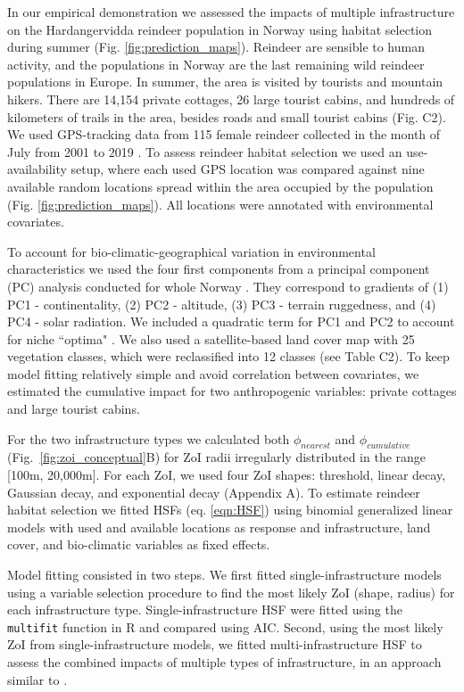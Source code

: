 \documentclass[titlepage]{article}
\begin{document}
In our empirical demonstration we assessed the impacts of multiple infrastructure on the Hardangervidda reindeer population in Norway using habitat selection during summer (Fig. \ref{fig:prediction_maps}). Reindeer are sensible to human activity, and the populations in Norway are the last remaining wild reindeer populations in Europe. In summer, the area is visited by tourists and mountain hikers. There are 14,154 private cottages, 26 large tourist cabins, and hundreds of kilometers of trails in the area, besides roads and small tourist cabins (Fig. C2). We used GPS-tracking data from 115 female reindeer collected in the month of July from 2001 to 2019 \citep[see][for further details]{panzacchi_searching_2015}. To assess reindeer habitat selection we used an use-availability setup, where each used GPS location was compared against nine available random locations spread within the area occupied by the population (Fig. \ref{fig:prediction_maps}). All locations were annotated with environmental covariates.

To account for bio-climatic-geographical variation in environmental characteristics we used the four first components from a principal component (PC) analysis conducted for whole Norway \citep{bakkestuen_step-less_2008}. They correspond to gradients of (1) PC1 - continentality, (2) PC2 - altitude, (3) PC3 - terrain ruggedness, and (4) PC4 - solar radiation. We included a quadratic term for PC1 and PC2 to account for niche ``optima" \citep[\textit{sensu}][]{panzacchi_searching_2015}. We also used a satellite-based land cover map with 25 vegetation classes, which were reclassified into 12 classes (see Table C2). To keep model fitting relatively simple and avoid correlation between covariates, we estimated the cumulative impact for two anthropogenic variables: private cottages and large tourist cabins.

For the two infrastructure types we calculated both $\phi_{nearest}$ and $\phi_{cumulative}$ (Fig.~\ref{fig:zoi_conceptual}B) for ZoI radii irregularly distributed in the range [100m, 20,000m]. For each ZoI, we used four ZoI shapes: threshold, linear decay, Gaussian decay, and exponential decay (Appendix A). To estimate reindeer habitat selection we fitted HSFs (eq. \ref{eqn:HSF}) using binomial generalized linear models \citep{fieberg_how_2021} with used and available locations as response and infrastructure, land cover, and bio-climatic variables as fixed effects. 

Model fitting consisted in two steps. We first fitted single-infrastructure models using a variable selection procedure \citep{burnham_model_2002} to find the most likely ZoI (shape, radius) for each infrastructure type. Single-infrastructure HSF were fitted using the \verb|multifit| function in R \citep{huais_multifit_2018} and compared using AIC. Second, using the most likely ZoI from single-infrastructure models, we fitted multi-infrastructure HSF to assess the combined impacts of multiple types of infrastructure, in an approach similar to \citet{laforge_process-focussed_2015}. 
\end{document}

